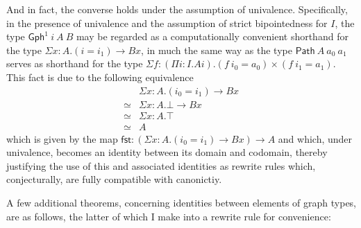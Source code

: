 \documentclass[
  12pt]{article}
\begin{document}
And in fact, the converse holds under the assumption of univalence.
Specifically, in the presence of univalence and the assumption of strict
bipointedness for \(I\), the type \(\mathsf{Gph}^1 ~ i ~ A ~ B\) may be
regarded as a computationally convenient shorthand for the type
\(\Sigma x : A . (i = i_1) \to B x\), in much the same way as the type
\(\mathsf{Path} ~ A ~ a_0 ~ a_1\) serves as shorthand for the type
\(\Sigma f : (\Pi i : I . A i) . (f ~ i_0 = a_0) \times (f ~ i_1 = a_1)\).
This fact is due to the following equivalence
\[\begin{array}{rl} &\Sigma x : A . (i_0 = i_1) \to B x\\ \simeq & \Sigma x : A . \bot \to B x\\ \simeq & \Sigma x : A . \top \\ \simeq & A \end{array}\]
which is given by the map
\(\mathsf{fst} : (\Sigma x : A . (i_0 = i_1) \to B x) \to A\) and which,
under univalence, becomes an identity between its domain and codomain,
thereby justifying the use of this and associated identities as rewrite
rules which, conjecturally, are fully compatible with canonictiy.

A few additional theorems, concerning identities between elements of
graph types, are as follows, the latter of which I make into a rewrite
rule for convenience:
\end{document}
